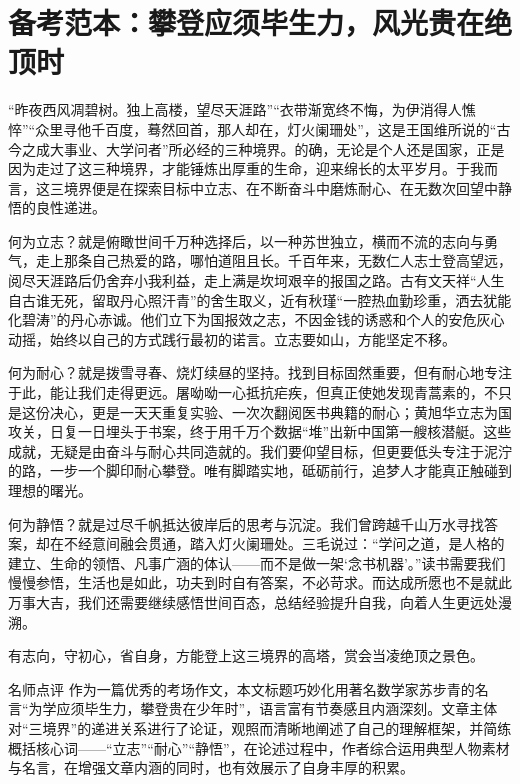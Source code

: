 \clearpage
\section*{备考范本：攀登应须毕生力，风光贵在绝顶时}

“昨夜西风凋碧树。独上高楼，望尽天涯路”“衣带渐宽终不悔，为伊消得人憔悴”“众里寻他千百度，蓦然回首，那人却在，灯火阑珊处”，这是王国维所说的“古今之成大事业、大学问者”所必经的三种境界。的确，无论是个人还是国家，正是因为走过了这三种境界，才能锤炼出厚重的生命，迎来绵长的太平岁月。于我而言，这三境界便是在探索目标中立志、在不断奋斗中磨炼耐心、在无数次回望中静悟的良性递进。

何为立志？就是俯瞰世间千万种选择后，以一种苏世独立，横而不流的志向与勇气，走上那条自己热爱的路，哪怕道阻且长。千百年来，无数仁人志士登高望远，阅尽天涯路后仍舍弃小我利益，走上满是坎坷艰辛的报国之路。古有文天祥“人生自古谁无死，留取丹心照汗青”的舍生取义，近有秋瑾“一腔热血勤珍重，洒去犹能化碧涛”的丹心赤诚。他们立下为国报效之志，不因金钱的诱惑和个人的安危灰心动摇，始终以自己的方式践行最初的诺言。立志要如山，方能坚定不移。

何为耐心？就是拨雪寻春、烧灯续昼的坚持。找到目标固然重要，但有耐心地专注于此，能让我们走得更远。屠呦呦一心抵抗疟疾，但真正使她发现青蒿素的，不只是这份决心，更是一天天重复实验、一次次翻阅医书典籍的耐心；黄旭华立志为国攻关，日复一日埋头于书案，终于用千万个数据“堆”出新中国第一艘核潜艇。这些成就，无疑是由奋斗与耐心共同造就的。我们要仰望目标，但更要低头专注于泥泞的路，一步一个脚印耐心攀登。唯有脚踏实地，砥砺前行，追梦人才能真正触碰到理想的曙光。

何为静悟？就是过尽千帆抵达彼岸后的思考与沉淀。我们曾跨越千山万水寻找答案，却在不经意间融会贯通，踏入灯火阑珊处。三毛说过：“学问之道，是人格的建立、生命的领悟、凡事广涵的体认——而不是做一架‘念书机器’。”读书需要我们慢慢参悟，生活也是如此，功夫到时自有答案，不必苛求。而达成所愿也不是就此万事大吉，我们还需要继续感悟世间百态，总结经验提升自我，向着人生更远处漫溯。

有志向，守初心，省自身，方能登上这三境界的高塔，赏会当凌绝顶之景色。

\begin{quoteBox}{名师点评}
作为一篇优秀的考场作文，本文标题巧妙化用著名数学家苏步青的名言“为学应须毕生力，攀登贵在少年时”，语言富有节奏感且内涵深刻。文章主体对“三境界”的递进关系进行了论证，观照而清晰地阐述了自己的理解框架，并简练概括核心词——“立志”“耐心”“静悟”，在论述过程中，作者综合运用典型人物素材与名言，在增强文章内涵的同时，也有效展示了自身丰厚的积累。
\end{quoteBox}
